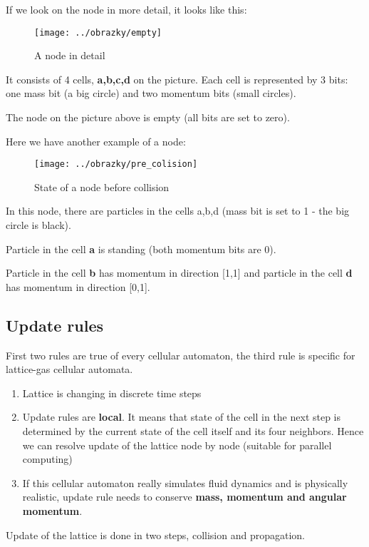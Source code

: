 If we look on the node in more detail, it looks like this:

\begin{figure}[htbp]
 \centering 
 \texttt{[image: ../obrazky/empty]}
 \label{empty}
 \caption{A node in detail}
\end{figure}

\newpage
It consists of 4 cells, \textbf{a,b,c,d} on the picture. Each cell is represented by 3 bits: one mass bit (a big circle) and two momentum bits (small circles).

The node on the picture above is empty (all bits are set to zero).

Here we have another example of a node:
\begin{figure}[htbp]
 \centering 
 \texttt{[image: ../obrazky/pre\_colision]}
 \label{pre_collision}
 \caption{State of a node before collision}
\end{figure}

In this node, there are particles in the cells a,b,d (mass bit is set to 1 - the big circle is black).

Particle in the cell \textbf{a} is standing (both momentum bits are 0).

Particle in the cell \textbf{b} has momentum in direction [1,1] and particle in the cell \textbf{d} has momentum in direction [0,1].

\subsection{Update rules}
First two rules are true of every cellular automaton, the third rule is specific for lattice-gas cellular automata.

\begin{enumerate}
\item Lattice is changing in discrete time steps
\item Update rules are \textbf{local}. It means that state of the cell in the next step is determined by the current state of the cell itself and its four neighbors. Hence we can resolve update of the lattice node by node (suitable for parallel computing)
\item If this cellular automaton really simulates fluid dynamics and is physically realistic, update rule needs to conserve \textbf{mass, momentum and angular momentum}.
\end{enumerate}

Update of the lattice is done in two steps, collision and propagation.


